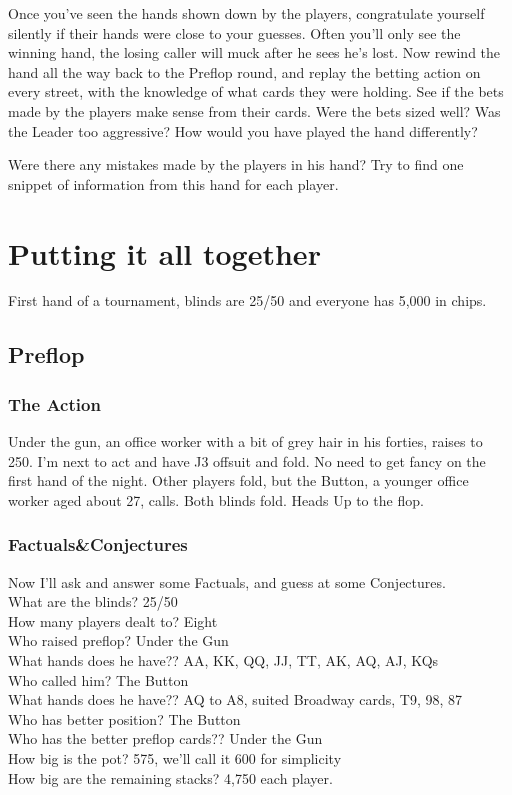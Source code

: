 Once you've seen the hands shown down by the players, congratulate yourself
silently if their hands were close to your guesses. Often you'll only
see the winning hand, the losing caller will muck after he sees
he's lost. Now rewind the hand all the way back to the Preflop round,
and replay the betting action on every street, with the knowledge of
what cards they were holding. See if the bets made by the players make
sense from their cards. Were the bets sized well? Was the Leader too
aggressive? How would you have played the hand differently?

Were there any mistakes made by the players in his hand? Try to find
one snippet of information from this hand for each player.

\section{Putting it all together}

First hand of a tournament, blinds are 25/50 and everyone has 5,000 in chips.

\subsection*{Preflop}

\subsubsection*{The Action}
Under the gun, an office worker with a bit of grey hair in his forties,
raises to 250. I'm next to act and have J3 offsuit and fold.
No need to get fancy on the first hand of the night. Other players fold,
but the Button, a younger office worker aged about 27, calls. Both blinds fold.
Heads Up to the flop.

\subsubsection*{Factuals\&Conjectures}
Now I'll ask and answer some Factuals, and guess at some Conjectures. \\
What are the blinds? 25/50 \\
How many players dealt to? Eight \\
Who raised preflop? Under the Gun \\
What hands does he have?? AA, KK, QQ, JJ, TT, AK, AQ, AJ, KQs \\
Who called him? The Button \\
What hands does he have?? AQ to A8, suited Broadway cards, T9, 98, 87 \\
Who has better position? The Button \\
Who has the better preflop cards?? Under the Gun \\
How big is the pot? 575, we'll call it 600 for simplicity \\
How big are the remaining stacks? 4,750 each player.

